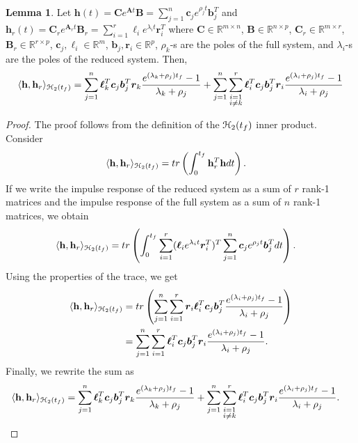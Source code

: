 \documentclass[preprint]{elsarticle}
\theoremstyle{definition}
\theoremstyle{definition}
\def\mathcal{\EuScript}
\numberwithin{equation}{section}
\newtheorem{Lemma}[Theorem]{Lemma}
\newcommand{\R}{\mathbb{R}}
\newcommand{\A}{\mathbf{A}}
\newcommand{\B}{\mathbf{B}}
\newcommand{\C}{\mathbf{C}}
\newcommand{\h}{\mathbf{h}}
\newcommand{\tf}{t_f}
\newcommand{\rc}{\boldsymbol{r}}
\newcommand{\lc}{\boldsymbol{\ell}}
\newcommand{\cc}{\boldsymbol{c}}
\newcommand{\bb}{\boldsymbol{b}}
\newcommand{\ch}{\mathcal{H}}
\begin{document}
\begin{Lemma}\label{minnerexp}
Let $\h (t)=\C e^{\A t}\B=\sum_{j=1}^n \cc_je^{\rho_jt}\bb_j^T$ and $\h_r(t)=\C_r e^{\A_r t}\B_r=\sum_{i=1}^r \lc_i e^{\lambda_it} \rc_i^T$ where $\C\in \R^{m\times n}$,  $\B\in \R^{n\times p}$, $\C_r\in \R^{m\times r}$,  $\B_r\in \R^{r\times p}$, $\cc_j, \lc_i\in \R^m$, $\bb_j, \rc_i\in \R^p$, $\rho_k$-s are  the poles of the full system, and $\lambda_i$-s are  the poles of the reduced system. Then, 
\begin{equation}
\begin{aligned}
\langle\h, \h_r\rangle_{\ch_2({\tf})}=\sum_{j=1}^n\lc_{k}^T\cc_j\bb_j^T\rc_{k}\dfrac{e^{(\lambda_k+\rho_j){\tf}}-1}{\lambda_k+\rho_j}
+\sum_{j=1}^n\sum_{\substack{i=1\\i\neq k}}^r\lc_{i}^T\cc_j\bb_j^T\rc_{i}\dfrac{e^{(\lambda_i+\rho_j){\tf}}-1}{\lambda_i+\rho_j}
\end{aligned}
\end{equation}
\end{Lemma}
\begin{proof}
The proof follows from the definition of the $\ch_2(\tf)$ inner product. Consider
\begin{align*}
\langle\h, \h_r\rangle_{\ch_2({\tf})}&=tr\left(\int_0^{\tf}\h_r^T\h dt\right).
\end{align*}
If we write the impulse response of the reduced system as a sum of $r$ rank-1 matrices and the impulse response of the full system as a sum of $n$ rank-1 matrices, we obtain
\begin{align*}
\langle\h, \h_r\rangle_{\ch_2({\tf})}&=tr\left(\int_0^{\tf}\sum_{i=1}^r(\lc_{i}e^{\lambda_it}\rc_{i}^T)^T\sum_{j=1}^n\cc_je^{\rho_jt}\bb_j^Tdt\right).
\end{align*}
Using the properties of the trace, we get
\begin{align*}
\langle\h, \h_r\rangle_{\ch_2({\tf})}&=tr\left(\sum_{j=1}^n\sum_{i=1}^r\rc_{i}\lc_{i}^T\cc_j\bb_j^T\dfrac{e^{(\lambda_i+\rho_j){\tf}}-1}{\lambda_i+\rho_j}\right)\\
&=\sum_{j=1}^n\sum_{i=1}^r\lc_{i}^T\cc_j\bb_j^T\rc_{i}\dfrac{e^{(\lambda_i+\rho_j){\tf}}-1}{\lambda_i+\rho_j}.
\end{align*}
Finally, we rewrite the sum as
\begin{align*}
\langle\h, \h_r\rangle_{\ch_2({\tf})}&=\sum_{j=1}^n\lc_{k}^T\cc_j\bb_j^T\rc_{k}\dfrac{e^{(\lambda_k+\rho_j){\tf}}-1}{\lambda_k+\rho_j}
+\sum_{j=1}^n\sum_{\substack{i=1\\i\neq k}}^r\lc_{i}^T\cc_j\bb_j^T\rc_{i}\dfrac{e^{(\lambda_i+\rho_j){\tf}}-1}{\lambda_i+\rho_j}.
\end{align*}
\end{proof}
\end{document}
